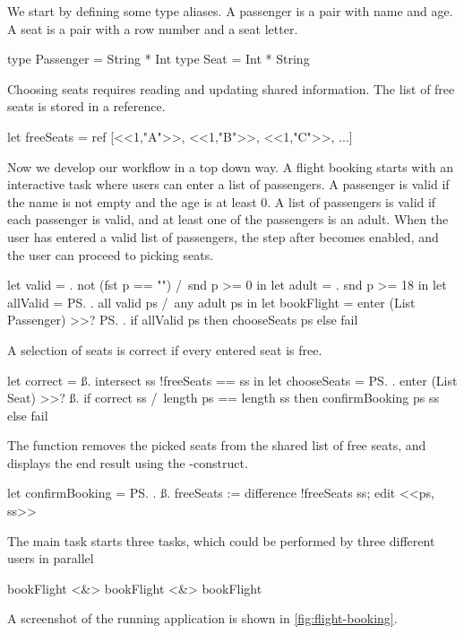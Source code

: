 \begin{example}
\label{exm:flight-booking}

We start by defining some type aliases.
A passenger is a pair with name and age.
A seat is a pair with a row number and a seat letter.
\begin{TASK}
  type Passenger = String * Int
  type Seat = Int * String
\end{TASK}

Choosing seats requires reading and updating shared information.
The list of free seats is stored in a reference. %
\begin{TASK}
  let freeSeats = ref [<<1,"A">>, <<1,"B">>, <<1,"C">>, ...]
\end{TASK}

Now we develop our workflow in a top down way.
A flight booking starts with an interactive task 
where users can enter a list of passengers.
A passenger is valid if the name is not empty and the age is at least 0.
A list of passengers is valid if each passenger is valid, and at least one of the passengers is an adult.
When the user has entered a valid list of passengers, the step after  becomes enabled,
and the user can proceed to picking seats.
\begin{TASK}
  let valid = \p. not (fst p == "") /\ snd p >= 0 in
  let adult = \p. snd p >= 18 in
  let allValid = \ps. all valid ps /\ any adult ps in
  let bookFlight = enter (List Passenger) >>? \ps.
    if allValid ps then chooseSeats ps else fail
\end{TASK}
A selection of seats is correct if every entered seat is free.
\begin{TASK}
  let correct = \ss. intersect ss !freeSeats == ss in
  let chooseSeats = \ps. enter (List Seat) >>? \ss.
    if correct ss /\ length ps == length ss
      then confirmBooking ps ss else fail
\end{TASK}
The function  removes the picked seats from the shared list of free seats,
and displays the end result using the -construct.
\begin{TASK}
  let confirmBooking = \ps. \ss.
    freeSeats := difference !freeSeats ss; edit <<ps, ss>>
\end{TASK}

The main task starts three  tasks,
which could be performed by three different users in parallel
\begin{TASK}
  bookFlight <&> bookFlight <&> bookFlight
\end{TASK}
A screenshot of the running application is shown in \cref{fig:flight-booking}.


\end{example}
